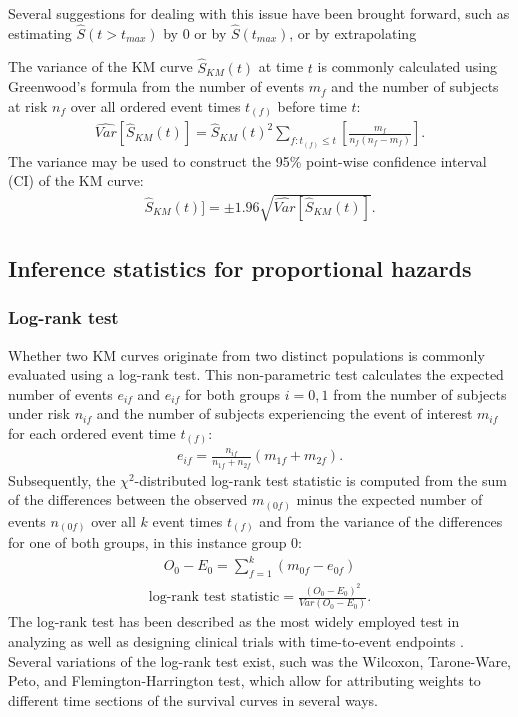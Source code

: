 \documentclass[main.tex]{subfiles}
\begin{document}
Several suggestions for dealing with this issue have been brought forward, such as estimating $\hat{S}(t>t_{max})$ by $0$ or by $\hat{S}(t_{max})$, or by extrapolating  

The variance of the KM curve $\hat{S}_{KM}(t)$ at time $t$ is commonly calculated using Greenwood's formula from the number of events $m_f$ and the number of subjects at risk $n_f$ over all ordered event times $t_(f)$ before time $t$:
\begin{align}
\hat{Var}[\hat{S}_{KM}(t)]=\hat{S}_{KM}(t)^2\sum_{f:t_{(f)}\leq t}\left[ \frac{m_f}{n_f(n_f-m_f)} \right].
\end{align}
The variance may be used to construct the 95\% point-wise confidence interval (CI) of the KM curve:
\begin{align}
\hat{S}_{KM}(t)]=\pm 1.96 \sqrt{\hat{Var}[\hat{S}_{KM}(t)]}.
\end{align}

\subsection{Inference statistics for proportional hazards}
\subsubsection{Log-rank test}
Whether two KM curves originate from two distinct populations  is commonly evaluated using a log-rank test. This non-parametric test calculates the expected number of events $e_{if}$ and $e_{if}$ for both groups  $i = 0,1$ from the number of subjects under risk $n_{if}$ and the number of subjects experiencing the event of interest $m_{if}$ for each ordered event time $t_{(f)}$:
\begin{align}
e_{if}=\frac{n_{if}}{n_{1f}+n_{2f}}(m_{1f}+m_{2f}).
\end{align}
Subsequently, the $\chi^2$-distributed log-rank test statistic is computed from the sum of the differences between the observed $m_{(0f)}$ minus the expected number of events $n_{(0f)}$ over all $k$ event times $t_{(f)}$ and from the variance of the differences for one of both groups, in this instance group $0$:
\begin{align}
O_0-E_0=\sum_{f=1}^{k}(m_{0f}-e_{0f})
\end{align}
\begin{align}
 \text{log-rank test statistic}=\frac{(O_0-E_0)^2}{Var(O_0-E_0)}.
\end{align}
The log-rank test has been described as the most widely employed test in analyzing as well as designing clinical trials with time-to-event endpoints \parencite{Yung2020-ht}. Several variations of the log-rank test exist, such was the Wilcoxon, Tarone-Ware, Peto, and Flemington-Harrington test, which allow for attributing weights to different time sections of the survival curves in several ways.
\end{document}
